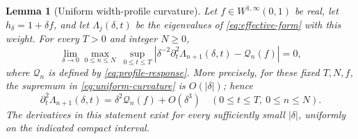\documentclass[11pt,a4paper]{article}
\newtheorem{lemma}[theorem]{Lemma}
\theoremstyle{definition}\newtheorem{definition}[theorem]{Definition}
\theoremstyle{remark}\newtheorem{remark}[theorem]{Remark}
\begin{document}
\begin{lemma}[Uniform width-profile curvature]
\label{lem:profile-curvature-uniform}
Let $f\in W^{1,\infty}(0,1)$ be real, let $h_\delta=1+\delta f$,
and let $\Lambda_j(\delta,t)$ be the eigenvalues of
\eqref{eq:effective-form} with this weight. For every $T>0$ and
integer $N\geq0$,
\begin{equation}\label{eq:uniform-curvature}
 \lim_{\delta\to0}\max_{0\leq n\leq N}\ 
 \sup_{0\leq t\leq T}
 \left|\delta^{-2}\partial_t^2\Lambda_{n+1}(\delta,t)
                      -\mathcal Q_n(f)\right|=0,
\end{equation}
where $\mathcal Q_n$ is defined by \eqref{eq:profile-response}.
More precisely, for these fixed $T,N,f$, the supremum in
\eqref{eq:uniform-curvature} is $O(|\delta|)$; hence
\begin{equation}\label{eq:uniform-expansion}
 \partial_t^2\Lambda_{n+1}(\delta,t)
 =\delta^2\mathcal Q_n(f)+O(\delta^3)
 \quad(0\leq t\leq T,\ 0\leq n\leq N).
\end{equation}
The derivatives in this statement exist for every sufficiently
small $|\delta|$, uniformly on the indicated compact interval.
\end{lemma}
\end{document}
